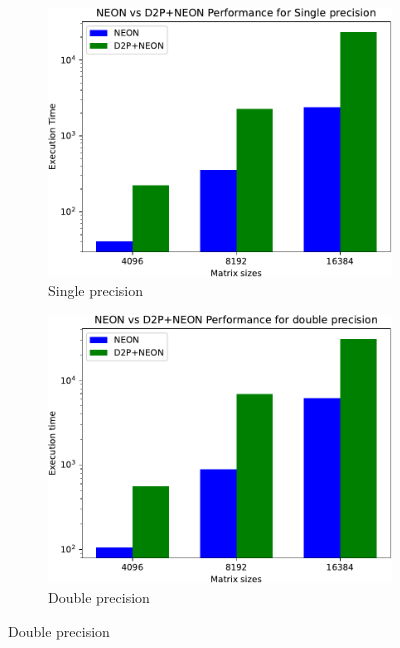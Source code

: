 

%


%


\begin{figure}[htbp]
\centering
\caption{Native Vs Hybrid using NEON intrinsics}
\begin{subfigure}{0.45\linewidth}
    \centering
    \includegraphics[width=0.90\linewidth]{Images/d2pvsNEONf-crop.pdf}
    \caption{Single precision}
    \label{fig:arm_float}
\end{subfigure}
\hfill
\begin{subfigure}{0.45\linewidth}
    \centering
    \includegraphics[width=0.90\linewidth]{Images/d2pvsNEONd-crop.pdf}
    \caption{Double precision}
    \label{fig:arm_double}
\end{subfigure}
\label{fig:arm}
\end{figure}  


